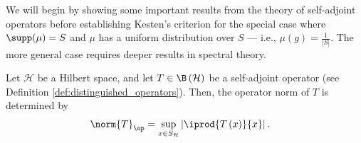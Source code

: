 We will begin by showing some important results from the theory of self-adjoint operators before establishing Kesten's criterion for the special case where $\supp(\mu) = S$ and $\mu$ has a uniform distribution over $S$ --- i.e., $\mu\left( g \right) = \frac{1}{\left\vert S \right\vert}$. The more general case requires deeper results in spectral theory.
\begin{lemma}\label{lemma:norm_self_adjoint_operator}
  Let $\mathcal{H}$ be a Hilbert space, and let $T\in\B\left( \mathcal{H} \right)$ be a self-adjoint operator (see Definition \ref{def:distinguished_operators}). Then, the operator norm of $T$ is determined by
  \begin{align*}
    \norm{T}_{\op} &= \sup_{x\in S_{\mathcal{H}}} \left\vert \iprod{T\left( x \right)}{x} \right\vert.
  \end{align*}
\end{lemma}
